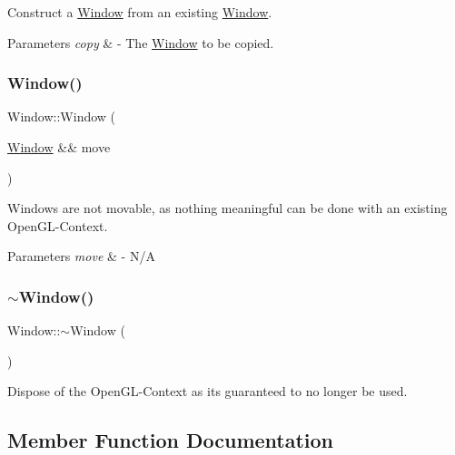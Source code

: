 Construct a \mbox{\hyperlink{class_window}{Window}} from an existing \mbox{\hyperlink{class_window}{Window}}. 
\begin{DoxyParams}{Parameters}
{\em copy} & -\/ The \mbox{\hyperlink{class_window}{Window}} to be copied. \\
\hline
\end{DoxyParams}
\mbox{\label{class_window_aa4086debceb557ecb6443cce32b41f9b}} 
\subsubsection{\texorpdfstring{Window()}{Window()}\hspace{0.1cm}{\footnotesize\ttfamily [3/3]}}
{\footnotesize\ttfamily Window\+::\+Window (\begin{DoxyParamCaption}\item[{\mbox{\hyperlink{class_window}{Window}} \&\&}]{move }\end{DoxyParamCaption})\hspace{0.3cm}{\ttfamily [delete]}}

Windows are not movable, as nothing meaningful can be done with an existing Open\+G\+L-\/\+Context. 
\begin{DoxyParams}{Parameters}
{\em move} & -\/ N/A \\
\hline
\end{DoxyParams}
\mbox{\label{class_window_a245d821e6016fa1f6970ccbbedd635f6}} 
\subsubsection{\texorpdfstring{$\sim$\+Window()}{~Window()}}
{\footnotesize\ttfamily Window\+::$\sim$\+Window (\begin{DoxyParamCaption}{ }\end{DoxyParamCaption})\hspace{0.3cm}{\ttfamily [virtual]}}

Dispose of the Open\+G\+L-\/\+Context as its guaranteed to no longer be used. 

\subsection{Member Function Documentation}
\mbox{\label{class_window_a8ad58be4ce5aec15ad590ce151d4776a}} 
